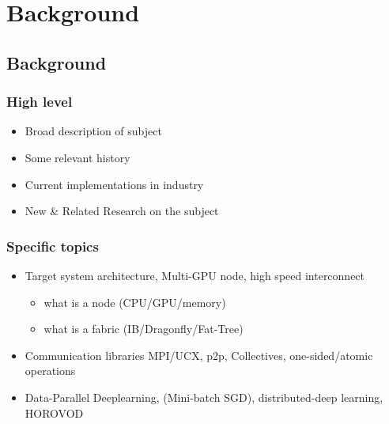 
\glsresetall %
\chapter[Background]{Background}\label{ch:Background}

\section{Background}
\subsection{High level}
\begin{itemize}
	\item{Broad description of subject}
	\item{Some relevant history}
	\item{Current implementations in industry}
	\item{New \& Related Research on the subject}
\end{itemize}

\subsection{Specific topics}
\begin{itemize}
    \item Target system architecture, Multi-GPU node, high speed interconnect
    \begin{itemize}
        \item what is a node (CPU/GPU/memory)
        \item what is a fabric (IB/Dragonfly/Fat-Tree)
    \end{itemize}
    \item Communication libraries MPI/UCX, p2p, Collectives, one-sided/atomic operations \cite{mpi40, gabriel2004OpenMPI, MPICH, shamis2015ucx}
    \item Data-Parallel Deeplearning, (Mini-batch SGD), distributed-deep learning, HOROVOD \cite{Ben-Nun2019DemystifyDL, Sergeev2018Horovod}
\end{itemize}

\clearpage

